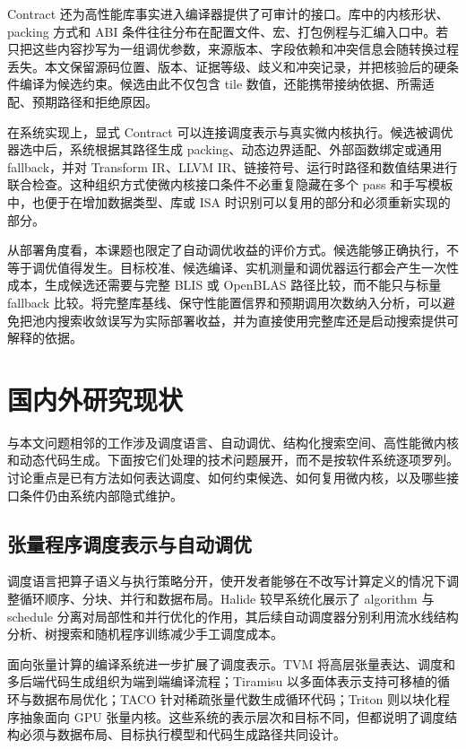 Contract 还为高性能库事实进入编译器提供了可审计的接口。库中的内核形状、packing 方式和 ABI 条件往往分布在配置文件、宏、打包例程与汇编入口中。若只把这些内容抄写为一组调优参数，来源版本、字段依赖和冲突信息会随转换过程丢失。本文保留源码位置、版本、证据等级、歧义和冲突记录，并把核验后的硬条件编译为候选约束。候选由此不仅包含 tile 数值，还能携带接纳依据、所需适配、预期路径和拒绝原因。

在系统实现上，显式 Contract 可以连接调度表示与真实微内核执行。候选被调优器选中后，系统根据其路径生成 packing、动态边界适配、外部函数绑定或通用 fallback，并对 Transform IR、LLVM IR、链接符号、运行时路径和数值结果进行联合检查。这种组织方式使微内核接口条件不必重复隐藏在多个 pass 和手写模板中，也便于在增加数据类型、库或 ISA 时识别可以复用的部分和必须重新实现的部分。

从部署角度看，本课题也限定了自动调优收益的评价方式。候选能够正确执行，不等于调优值得发生。目标校准、候选编译、实机测量和调优器运行都会产生一次性成本，生成候选还需要与完整 BLIS 或 OpenBLAS 路径比较，而不能只与标量 fallback 比较。将完整库基线、保守性能置信界和预期调用次数纳入分析，可以避免把池内搜索收敛误写为实际部署收益，并为直接使用完整库还是启动搜索提供可解释的依据。

\section{国内外研究现状}

与本文问题相邻的工作涉及调度语言、自动调优、结构化搜索空间、高性能微内核和动态代码生成。下面按它们处理的技术问题展开，而不是按软件系统逐项罗列。讨论重点是已有方法如何表达调度、如何约束候选、如何复用微内核，以及哪些接口条件仍由系统内部隐式维护。

\subsection{张量程序调度表示与自动调优}

调度语言把算子语义与执行策略分开，使开发者能够在不改写计算定义的情况下调整循环顺序、分块、并行和数据布局。Halide 较早系统化展示了 algorithm 与 schedule 分离对局部性和并行优化的作用\cite{RaganKelley2013Halide}，其后续自动调度器分别利用流水线结构分析、树搜索和随机程序训练减少手工调度成本\cite{Mullapudi2016HalideAutoscheduler,Adams2019HalideAutoscheduler}。

面向张量计算的编译系统进一步扩展了调度表示。TVM 将高层张量表达、调度和多后端代码生成组织为端到端编译流程\cite{Chen2018TVM}；Tiramisu 以多面体表示支持可移植的循环与数据布局优化\cite{Baghdadi2019Tiramisu}；TACO 针对稀疏张量代数生成循环代码\cite{Kjolstad2017TACO}；Triton 则以块化程序抽象面向 GPU 张量内核\cite{Tillet2019Triton}。这些系统的表示层次和目标不同，但都说明了调度结构必须与数据布局、目标执行模型和代码生成路径共同设计。

